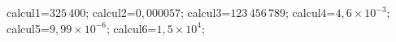\documentclass[exercice]{thedocument}%
\begin{document}
%
    \>calcul1=$325\,400$;%
    \>calcul2=$0,000057$;%
    \>calcul3=$123\,456\,789$;%
    \>calcul4=$4,6\times10^{-3}$;%
    \>calcul5=$9,99\times10^{-6}$;%
    \>calcul6=$1,5\times10^{4}$;%
\end{document}
